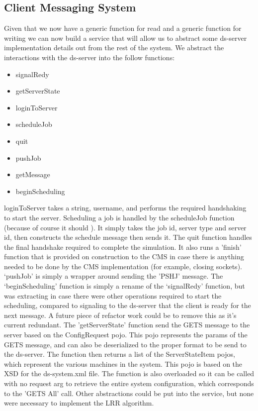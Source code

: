 \documentclass[a4paper]{article} %
\begin{document}
\subsection*{Client Messaging System}
Given that we now have a generic function for read and a generic function for writing we can now build a service that will allow us to abstract some ds-server implementation details out from the rest of the system.
We abstract the interactions with the ds-server into the follow functions:
\begin{itemize}
    \item signalRedy
    \item getServerState
    \item loginToServer
    \item scheduleJob
    \item quit
    \item pushJob
    \item getMessage
    \item beginScheduling
\end{itemize}
loginToServer takes a string, username, and performs the required handshaking to start the server.
Scheduling a job is handled by the scheduleJob function (because of course it should \cite{loureiro_2015}). It simply takes the job id, server type and server id, then constructs the schedule message then sends it.
The quit function handles the final handshake required to complete the simulation. It also runs a 'finish' function that is provided on construction to the CMS in case there is anything needed to be done by the CMS implementation (for example, closing sockets).
`pushJob' is simply a wrapper around sending the 'PSHJ' message. The `beginScheduling' function is simply a rename of the `signalRedy' function, but was extracting in case there were other operations required to start the scheduling, compared to signaling to the ds-server that the client is ready for the next message. A future piece of refactor work could be to remove this as it's current redundant. 
\newline
The 'getServerState' function send the GETS message to the server based on the ConfigRequest pojo.
This pojo represents the params of the GETS message, and can also be deserialized to the proper format to be send to the ds-server.
The function then returns a list of the ServerStateItem pojos, which represent the various machines in the system. This pojo is based on the XSD for the ds-system.xml file.
The function is also overloaded so it can be called with no request arg to retrieve the entire system configuration, which corresponds to the 'GETS All' call.
Other abstractions could be put into the service, but none were necessary to implement the LRR algorithm.
\end{document}
